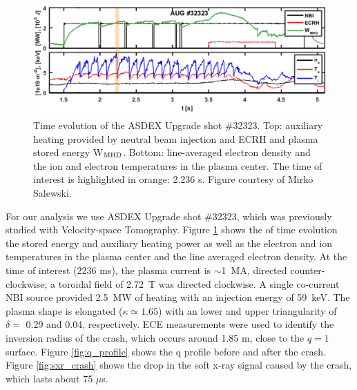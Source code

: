 \begin{figure}[h!]
    \centering
    \includegraphics[width=16cm]{figures/32323_plasma.png}
    \caption{Time evolution of the ASDEX Upgrade shot \#32323. Top: auxiliary heating provided by neutral beam injection and ECRH and plasma stored energy W$_{\rm{MHD}}$. Bottom: line-averaged electron density and the ion and electron temperatures in the plasma center. The time of interest is highlighted in orange: 2.236 s. Figure courtesy of Mirko Salewski.\cite{salewski2018deuterium}}
    \label{fig:augd_plasma}
\end{figure}
For our analysis we use ASDEX Upgrade shot \#32323, which was previously studied with Velocity-space Tomography.\cite{salewski2016high,salewski2018deuterium} Figure \ref{fig:augd_plasma} shows the of time evolution the stored energy and auxiliary heating power as well as the electron and ion temperatures in the plasma center and the line averaged electron density. At the time of interest (2236 ms), the plasma current is $\sim$1~MA, directed counter-clockwise; a toroidal field of 2.72~T was directed clockwise. A single co-current NBI source provided 2.5~MW of heating with an injection energy of 59~keV. The plasma shape is elongated ($\kappa \simeq 1.65$) with an lower and upper triangularity of $\delta = $ 0.29 and 0.04, respectively. ECE measurements were used to identify the inversion radius of the crash, which occurs around 1.85 m, close to the $q=1$ surface. Figure \ref{fig:q_profile} shows the q profile before and after the crash. Figure \ref{fig:sxr_crash} shows the drop in the soft x-ray signal caused by the crash, which lasts about 75 $\mu$s. 
